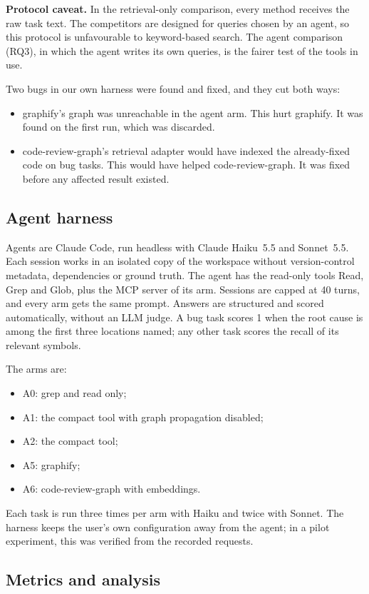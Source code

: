 \documentclass[sigconf,nonacm]{acmart}
\newcommand{\gfy}{graphify\xspace}
\newcommand{\crg}{code-review-graph\xspace}
\newcommand{\cmp}{\textsf{compact}\xspace}
\begin{document}
\textbf{Protocol caveat.} In the retrieval-only comparison, every method receives the raw task text. The competitors are designed for queries chosen by an agent, so this protocol is unfavourable to keyword-based search. The agent comparison (RQ3), in which the agent writes its own queries, is the fairer test of the tools in use.

Two bugs in our own harness were found and fixed, and they cut both ways:
\begin{itemize}
\item \gfy's graph was unreachable in the agent arm. This hurt \gfy. It was found on the first run, which was discarded.
\item \crg's retrieval adapter would have indexed the already-fixed code on bug tasks. This would have helped \crg. It was fixed before any affected result existed.
\end{itemize}

\subsection{Agent harness}

Agents are Claude Code, run headless with Claude Haiku~5.5 and Sonnet~5.5. Each session works in an isolated copy of the workspace without version-control metadata, dependencies or ground truth. The agent has the read-only tools Read, Grep and Glob, plus the MCP server of its arm. Sessions are capped at 40 turns, and every arm gets the same prompt. Answers are structured and scored automatically, without an LLM judge. A bug task scores 1 when the root cause is among the first three locations named; any other task scores the recall of its relevant symbols.

The arms are:
\begin{itemize}
\item A0: grep and read only;
\item A1: the \cmp tool with graph propagation disabled;
\item A2: the \cmp tool;
\item A5: \gfy;
\item A6: \crg with embeddings.
\end{itemize}
Each task is run three times per arm with Haiku and twice with Sonnet. The harness keeps the user's own configuration away from the agent; in a pilot experiment, this was verified from the recorded requests.

\subsection{Metrics and analysis}
\end{document}
